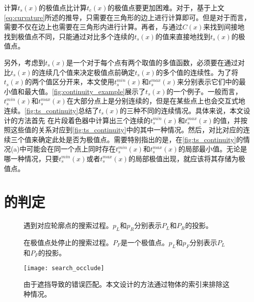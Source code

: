 {计算$t_s(x)$的极值点比计算$t_c(x)$的极值点要更加困难。对于\con{}，基于上文\autoref{eq:curvature}所述的推导，只需要在三角形的边上进行计算即可。但是对于\scon{}而言，需要不仅在边上也需要在三角形内进行计算。再者，与通过$C(x)$来找到间接地找到极值点不同，只能通过对比多个连续的$t_s(x)$的值来直接地找到$t_s(x)$的极值点。

另外，考虑到$t_s(x)$是一个对于每个点有两个取值的多值函数，必须要在通过对比$t_s(x)$的连续几个值来决定极值点前确定$t_s(x)$的多个值的连续性。为了将$t_s(x)$的两个值区分开来，本文使用$t_s^{min}(x)$和$t_s^{max}(x)$来分别表示它们中的最小值和最大值。\autoref{fig:continuity_example}展示了$t_s(x)$的一个例子。一般而言，$t_s^{min}(x)$和$t_s^{max}(x)$在大部分点上是分别连续的，但是在某些点上也会交互式地连续。\autoref{fig:ts_continuity}总结了$t_s(x)$的三种不同的连续情况。具体来说，本文设计的方法首先
在片段着色器中计算出三个连续的$t_s^{min}(x)$和$t_s^{max}(x)$的值，并按照这些值的关系对应到\autoref{fig:ts_continuity}中的其中一种情况。然后，对比对应的连续三个值来确定此处是否为极值点。需要特别指出的是，在\autoref{fig:ts_continuity}的情况(a)中可能会在同一个点上同时存在$t_s^{min}(x)$和$t_s^{max}(x)$的局部最小值。无论是哪一种情况，只要$t_s^{min}(x)$或者$t_s^{max}(x)$的局部极值出现，就应该将其存储为极值点。

\section{\epsl{}的判定}

\begin{figure}[!t]
    \centering
    \hfil
    \caption{遇到对应轮廓点的搜索过程。$p_L$和$p_R$分别表示$P_L$和$P_R$的投影。}\label{fig:succeed in image space search}
\end{figure}

\begin{figure}[!t]
    \centering
    \hfil
    \caption{在极值点处停止的搜索过程。$P_F$是一个极值点。$p_L$和$p_F$分别表示$P_L$和$P_F$的投影。} \label{fig:fail in image space search}
\end{figure}

\begin{figure}[!t]
    \centering
    \texttt{[image: search\_occlude]}
    \caption{\label{fig:occlude}
    由于遮挡导致的错误匹配。本文设计的方法通过物体的索引来排除这种情况。}
\end{figure}

}
